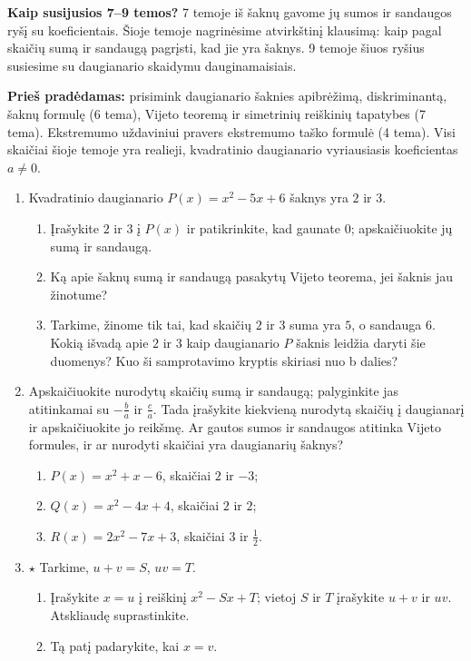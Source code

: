 \documentclass[12pt,a4paper]{article}
\begin{document}
\textbf{Kaip susijusios 7–9 temos?} 7 temoje iš šaknų gavome jų sumos ir sandaugos ryšį su koeficientais. Šioje temoje nagrinėsime atvirkštinį klausimą: kaip pagal skaičių sumą ir sandaugą pagrįsti, kad jie yra šaknys. 9 temoje šiuos ryšius susiesime su daugianario skaidymu dauginamaisiais.

\textbf{Prieš pradėdamas:} prisimink daugianario šaknies apibrėžimą, diskriminantą, šaknų formulę (6 tema), Vijeto teoremą ir simetrinių reiškinių tapatybes (7 tema). Ekstremumo uždaviniui pravers ekstremumo taško formulė (4 tema). Visi skaičiai šioje temoje yra realieji, kvadratinio daugianario vyriausiasis koeficientas $a\ne0$.
\begin{enumerate}[series=uzdaviniai]
\item Kvadratinio daugianario $P(x)=x^2-5x+6$ šaknys yra $2$ ir $3$.
\begin{enumerate}
\item Įrašykite $2$ ir $3$ į $P(x)$ ir patikrinkite, kad gaunate $0$; apskaičiuokite jų sumą ir sandaugą.
\item Ką apie šaknų sumą ir sandaugą pasakytų Vijeto teorema, jei šaknis jau žinotume?
\item Tarkime, žinome tik tai, kad skaičių $2$ ir $3$ suma yra $5$, o sandauga $6$. Kokią išvadą apie $2$ ir $3$ kaip daugianario $P$ šaknis leidžia daryti šie duomenys? Kuo ši samprotavimo kryptis skiriasi nuo b dalies?
\end{enumerate}
\item Apskaičiuokite nurodytų skaičių sumą ir sandaugą; palyginkite jas atitinkamai su $-\frac{b}{a}$ ir $\frac{c}{a}$. Tada įrašykite kiekvieną nurodytą skaičių į daugianarį ir apskaičiuokite jo reikšmę. Ar gautos sumos ir sandaugos atitinka Vijeto formules, ir ar nurodyti skaičiai yra daugianarių šaknys?
\begin{enumerate}
\item $P(x)=x^2+x-6$, skaičiai $2$ ir $-3$; \item $Q(x)=x^2-4x+4$, skaičiai $2$ ir $2$; \item $R(x)=2x^2-7x+3$, skaičiai $3$ ir $\frac{1}{2}$.
\end{enumerate}
\needspace{6cm}
\item\label{atzingsnis} $\star$ Tarkime, $u+v=S$, $uv=T$.
\begin{enumerate}
\item Įrašykite $x=u$ į reiškinį $x^2-Sx+T$; vietoj $S$ ir $T$ įrašykite $u+v$ ir $uv$. Atskliaudę suprastinkite.
\item Tą patį padarykite, kai $x=v$.

\end{enumerate}
\end{enumerate}
\end{document}
